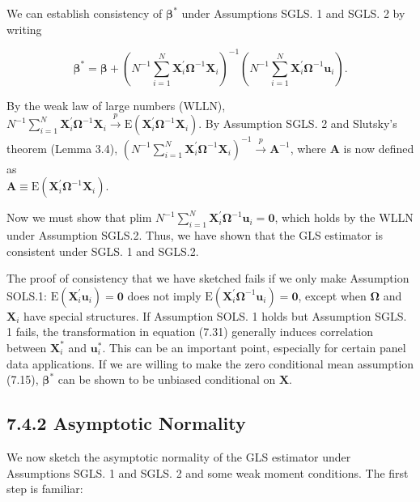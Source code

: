 \documentclass[10pt]{article}
\begin{document}
We can establish consistency of $\boldsymbol{\beta}^{*}$ under Assumptions SGLS. 1 and SGLS. 2 by writing


\begin{equation*}
\boldsymbol{\beta}^{*}=\boldsymbol{\beta}+\left(N^{-1} \sum_{i=1}^{N} \mathbf{X}_{i}^{\prime} \boldsymbol{\Omega}^{-1} \mathbf{X}_{i}\right)^{-1}\left(N^{-1} \sum_{i=1}^{N} \mathbf{X}_{i}^{\prime} \boldsymbol{\Omega}^{-1} \mathbf{u}_{i}\right) . \tag{7.33}
\end{equation*}


By the weak law of large numbers (WLLN), $N^{-1} \sum_{i=1}^{N} \mathbf{X}_{i}^{\prime} \boldsymbol{\Omega}^{-1} \mathbf{X}_{i} \xrightarrow{p} \mathrm{E}\left(\mathbf{X}_{i}^{\prime} \boldsymbol{\Omega}^{-1} \mathbf{X}_{i}\right)$. By Assumption SGLS. 2 and Slutsky's theorem (Lemma 3.4), $\left(N^{-1} \sum_{i=1}^{N} \mathbf{X}_{i}^{\prime} \boldsymbol{\Omega}^{-1} \mathbf{X}_{i}\right)^{-1} \xrightarrow{p} \mathbf{A}^{-1}$, where $\mathbf{A}$ is now defined as\\
$\mathbf{A} \equiv \mathrm{E}\left(\mathbf{X}_{i}^{\prime} \boldsymbol{\Omega}^{-1} \mathbf{X}_{i}\right)$.

Now we must show that plim $N^{-1} \sum_{i=1}^{N} \mathbf{X}_{i}^{\prime} \boldsymbol{\Omega}^{-1} \mathbf{u}_{i}=\mathbf{0}$, which holds by the WLLN under Assumption SGLS.2. Thus, we have shown that the GLS estimator is consistent under SGLS. 1 and SGLS.2.

The proof of consistency that we have sketched fails if we only make Assumption SOLS.1: $\mathrm{E}\left(\mathbf{X}_{i}^{\prime} \mathbf{u}_{i}\right)=\mathbf{0}$ does not imply $\mathrm{E}\left(\mathbf{X}_{i}^{\prime} \boldsymbol{\Omega}^{-1} \mathbf{u}_{i}\right)=\mathbf{0}$, except when $\boldsymbol{\Omega}$ and $\mathbf{X}_{i}$ have special structures. If Assumption SOLS. 1 holds but Assumption SGLS. 1 fails, the transformation in equation (7.31) generally induces correlation between $\mathbf{X}_{i}^{*}$ and $\mathbf{u}_{i}^{*}$. This can be an important point, especially for certain panel data applications. If we are willing to make the zero conditional mean assumption (7.15), $\boldsymbol{\beta}^{*}$ can be shown to be unbiased conditional on $\mathbf{X}$.

\subsection*{7.4.2 Asymptotic Normality}
We now sketch the asymptotic normality of the GLS estimator under Assumptions SGLS. 1 and SGLS. 2 and some weak moment conditions. The first step is familiar:
\end{document}
